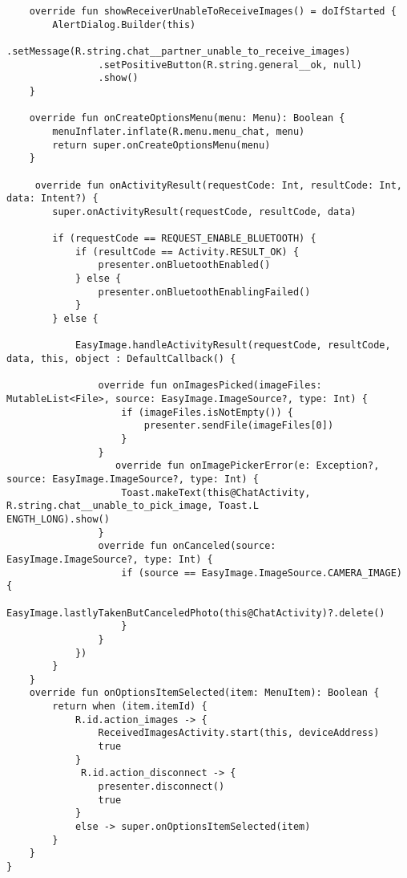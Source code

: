\begin{lstlisting}
    override fun showReceiverUnableToReceiveImages() = doIfStarted {
        AlertDialog.Builder(this)
                .setMessage(R.string.chat__partner_unable_to_receive_images)
                .setPositiveButton(R.string.general__ok, null)
                .show()
    }

    override fun onCreateOptionsMenu(menu: Menu): Boolean {
        menuInflater.inflate(R.menu.menu_chat, menu)
        return super.onCreateOptionsMenu(menu)
    }

	 override fun onActivityResult(requestCode: Int, resultCode: Int, data: Intent?) {
        super.onActivityResult(requestCode, resultCode, data)

        if (requestCode == REQUEST_ENABLE_BLUETOOTH) {
            if (resultCode == Activity.RESULT_OK) {
                presenter.onBluetoothEnabled()
            } else {
                presenter.onBluetoothEnablingFailed()
            }
        } else {

            EasyImage.handleActivityResult(requestCode, resultCode, data, this, object : DefaultCallback() {

                override fun onImagesPicked(imageFiles: MutableList<File>, source: EasyImage.ImageSource?, type: Int) {
                    if (imageFiles.isNotEmpty()) {
                        presenter.sendFile(imageFiles[0])
                    }
                }
				   override fun onImagePickerError(e: Exception?, source: EasyImage.ImageSource?, type: Int) {
                    Toast.makeText(this@ChatActivity, R.string.chat__unable_to_pick_image, Toast.L
ENGTH_LONG).show()
                }
                override fun onCanceled(source: EasyImage.ImageSource?, type: Int) {
                    if (source == EasyImage.ImageSource.CAMERA_IMAGE) {
                        EasyImage.lastlyTakenButCanceledPhoto(this@ChatActivity)?.delete()
                    }
                }
            })
        }
    }
    override fun onOptionsItemSelected(item: MenuItem): Boolean {
        return when (item.itemId) {
            R.id.action_images -> {
                ReceivedImagesActivity.start(this, deviceAddress)
                true
            }
			 R.id.action_disconnect -> {
                presenter.disconnect()
                true
            }
            else -> super.onOptionsItemSelected(item)
		}
	}
}
\end{lstlisting}
